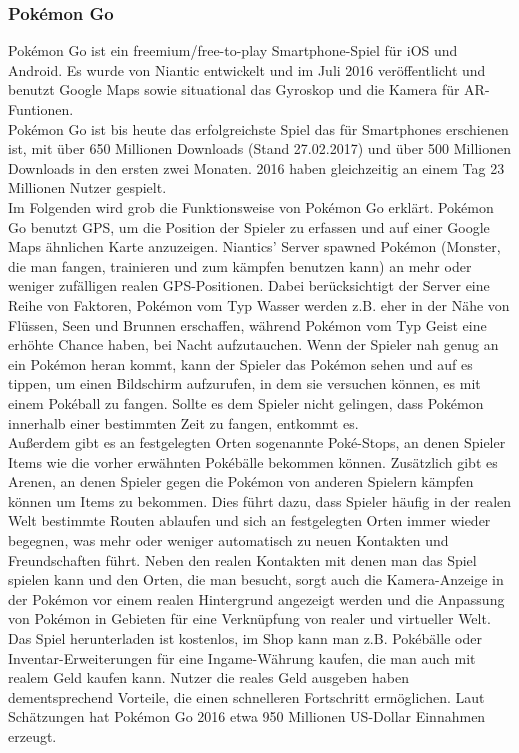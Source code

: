 \documentclass[extern,palatino]{cgBA}
\begin{document}
\subsubsection{Pokémon Go}
Pokémon Go ist ein freemium/free-to-play Smartphone-Spiel für iOS und Android. Es wurde von Niantic entwickelt und im Juli 2016 veröffentlicht und benutzt Google Maps sowie situational das Gyroskop und die Kamera für AR-Funtionen. 
\\Pokémon Go ist bis heute das erfolgreichste Spiel das für Smartphones erschienen ist, mit über 650 Millionen Downloads (Stand 27.02.2017) und über 500 Millionen Downloads in den ersten zwei Monaten.%
 2016 haben gleichzeitig an einem Tag 23 Millionen Nutzer gespielt.
\\
Im Folgenden wird grob die Funktionsweise von Pokémon Go erklärt. Pokémon Go benutzt GPS, um die Position der Spieler zu erfassen und auf einer Google Maps ähnlichen Karte anzuzeigen. Niantics' Server spawned Pokémon (Monster, die man fangen, trainieren und zum kämpfen benutzen kann) an mehr oder weniger zufälligen realen GPS-Positionen. Dabei berücksichtigt der Server eine Reihe von Faktoren, Pokémon vom Typ Wasser werden z.B. eher in der Nähe von Flüssen, Seen und Brunnen erschaffen, während Pokémon vom Typ Geist eine erhöhte Chance haben, bei Nacht aufzutauchen. Wenn der Spieler nah genug an ein Pokémon heran kommt, kann der Spieler das Pokémon sehen und auf es tippen, um einen Bildschirm aufzurufen, in dem sie versuchen können, es mit einem Pokéball zu fangen. Sollte es dem Spieler nicht gelingen, dass Pokémon innerhalb einer bestimmten Zeit zu fangen, entkommt es.
\\Außerdem gibt es an festgelegten Orten sogenannte Poké-Stops, an denen Spieler Items wie die vorher erwähnten Pokébälle bekommen können. Zusätzlich gibt es Arenen, an denen Spieler gegen die Pokémon von anderen Spielern kämpfen können um Items zu bekommen. Dies führt dazu, dass Spieler häufig in der realen Welt bestimmte Routen ablaufen und sich an festgelegten Orten immer wieder begegnen, was mehr oder weniger automatisch zu neuen Kontakten und Freundschaften führt. Neben den realen Kontakten mit denen man das Spiel spielen kann und den Orten, die man besucht, sorgt auch die Kamera-Anzeige in der Pokémon vor einem realen Hintergrund angezeigt werden und die Anpassung von Pokémon in Gebieten für eine Verknüpfung von realer und virtueller Welt. 
\\Das Spiel herunterladen ist kostenlos, im Shop kann man z.B. Pokébälle oder Inventar-Erweiterungen für eine Ingame-Währung kaufen, die man auch mit realem Geld kaufen kann. Nutzer die reales Geld ausgeben haben dementsprechend Vorteile, die einen schnelleren Fortschritt ermöglichen. Laut Schätzungen hat Pokémon Go 2016 etwa 950 Millionen US-Dollar Einnahmen erzeugt.%
\end{document}
